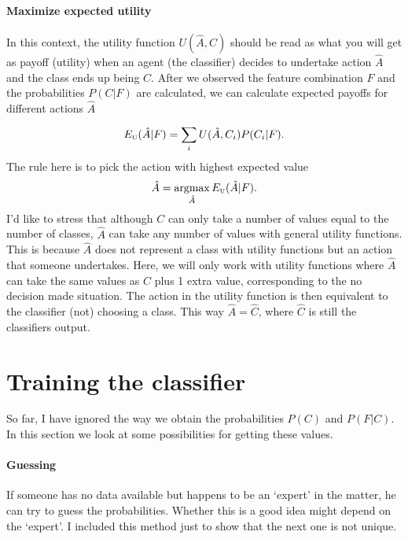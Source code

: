 \documentclass{report}
\DeclareMathOperator*{\argmax}{argmax}
\theoremstyle{definition}
\begin{document}
\paragraph{Maximize expected utility}
In this context, the utility function $U({\hat{A}},C)$ should be read as what you will get as payoff (utility) when an agent (the classifier) decides to undertake action $\hat{A}$ and the class ends up being $C$. After we observed the feature combination $F$ and the probabilities $P(C|F)$ are calculated, we can calculate expected payoffs for different actions $\hat A$
\begin{equation}
E_{\mbox {\tiny U}}(\hat A|F)=\sum_{i}^{}U(\hat A,C_i)P(C_i|F).
\end{equation}
The rule here is to pick the action with highest expected value
\begin{equation}
\hat A = \argmax_{\hat A}E_{\mbox {\tiny U}}(\hat A|F).
\end{equation}
I'd like to stress that although $C$ can only take a number of values equal to the number of classes, $\hat A$ can take any number of values with general utility functions. This is because $\hat A$ does not represent a class with utility functions but an action that someone undertakes. Here, we will only work with utility functions where $\hat A$ can take the same values as $C$ plus 1 extra value, corresponding to the no decision made situation. The action in the utility function is then equivalent to the classifier (not) choosing a class. This way $\hat A = \hat C$, where $\hat C$ is still the classifiers output.

\section{Training the classifier}
So far, I have ignored the way we obtain the probabilities $P(C)$ and $P(F|C)$. In this section we look at some possibilities for getting these values.
\paragraph{Guessing}
 If someone has no data available but happens to be an \lq expert' in the matter, he can try to guess the probabilities. Whether this is a good idea might depend on the \lq expert'. I included this method just to show that the next one is not unique.
\end{document}
